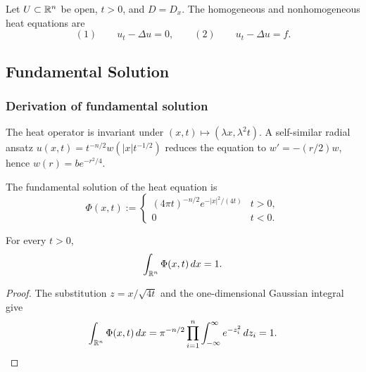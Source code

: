 Let $U\subset\mathbb{R}^n$ be open, $t>0$, and $D=D_x$. The homogeneous and
nonhomogeneous heat equations are
$$(1)\qquad u_t-\Delta u=0,
\qquad
(2)\qquad u_t-\Delta u=f.$$

\subsection{Fundamental Solution}
\label{sec:heat-fundamental-solution}

\subsubsection{Derivation of fundamental solution}
\label{sec:heat-fundamental-solution-derivation}

The heat operator is invariant under $(x,t)\mapsto(\lambda x,\lambda^2t)$.
A self-similar radial ansatz
$u(x,t)=t^{-n/2}w(|x|t^{-1/2})$ reduces the equation to
$w'=-(r/2)w$, hence $w(r)=be^{-r^2/4}$.

\begin{definition}
\label{def:fundamental-solution-heat-equation}




The fundamental solution of the heat equation is
$$\Phi(x,t):=
\begin{cases}
(4\pi t)^{-n/2}e^{-|x|^2/(4t)}&t>0,\\
0&t<0.
\end{cases}$$
\end{definition}

\begin{lemma}
\label{lem:integral-fundamental-solution-heat}





For every $t>0$,
$$\int_{\mathbb{R}^n}\Phi(x,t)\,dx=1.$$
\end{lemma}
\begin{proof}

\sketch The substitution $z=x/\sqrt{4t}$ and the one-dimensional Gaussian
integral give
$$\int_{\mathbb{R}^n}\Phi(x,t)\,dx
=\pi^{-n/2}\prod_{i=1}^n\int_{-\infty}^\infty e^{-z_i^2}\,dz_i=1.$$
\end{proof}

